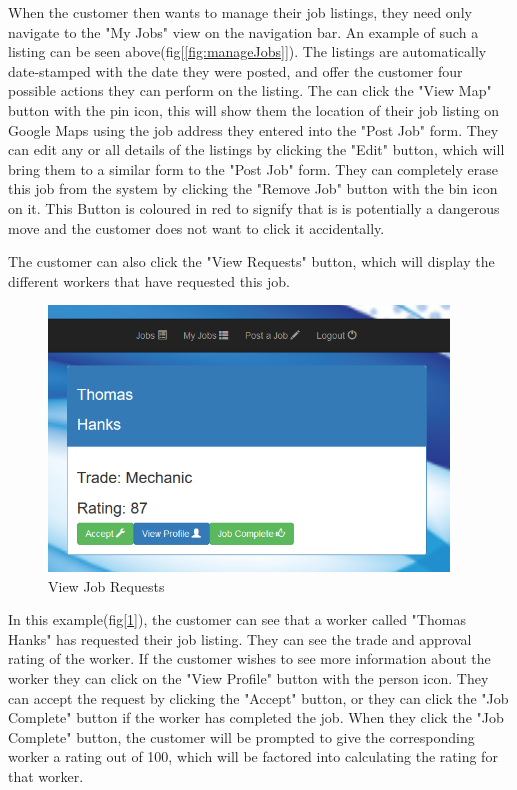 When the customer then wants to manage their job listings, they need only navigate to the "My Jobs" view on the navigation bar. An example of such a listing can be seen above(fig[\ref{fig:manageJobs}]). The listings are automatically date-stamped with the date they were posted, and offer the customer four possible actions they can perform on the listing. The can click the "View Map" button with the pin icon, this will show them the location of their job listing on Google Maps using the job address they entered into the "Post Job" form. They can edit any or all details of the listings by clicking the "Edit" button, which will bring them to a similar form to the "Post Job" form. They can completely erase this job from the system by clicking the "Remove Job" button with the bin icon on it. This Button is coloured in red to signify that is is potentially a dangerous move and the customer does not want to click it accidentally.

\bigskip

The customer can also click the "View Requests" button, which will display the different workers that have requested this job.

\begin{figure}[H]
    \centering
    \includegraphics[width=\textwidth, height=200pt]{img/Customer4.PNG}
    \caption{View Job Requests}
    \label{fig:viewRequests}
\end{figure}

\bigskip

In this example(fig[\ref{fig:viewRequests}]), the customer can see that a worker called "Thomas Hanks" has requested their job listing. They can see the trade and approval rating of the worker. If the customer wishes to see more information about the worker they can click on the "View Profile" button with the person icon. They can accept the request by clicking the "Accept" button, or they can click the "Job Complete" button if the worker has completed the job. When they click the "Job Complete" button, the customer will be prompted to give the corresponding worker a rating out of 100, which will be factored into calculating the rating for that worker.

